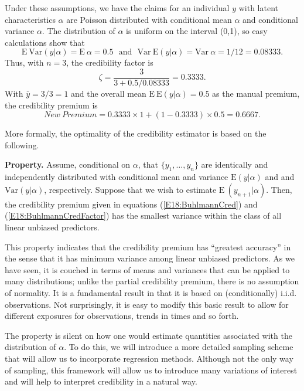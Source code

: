 Under these assumptions, we have the claims for an individual $y$
with latent characteristics $\alpha$ are Poisson distributed with
conditional mean $\alpha$ and conditional variance $\alpha$. The
distribution of $\alpha$ is uniform on the interval (0,1), so easy
calculations show that
\begin{equation*}
\mathrm{E}~\mathrm{Var}(y|\alpha) = \mathrm{E}~\alpha =
0.5~~~\mathrm{and}~~~ \mathrm{Var}~\mathrm{E}(y|\alpha) =
\mathrm{Var}~\alpha = 1/12 = 0.08333.
\end{equation*}
Thus, with $n=3$, the credibility factor is
\begin{equation*}
\zeta = \frac{3}{3+ 0.5/0.08333} = 0.3333.
\end{equation*}
With $\bar{y}=3/3 =1$ and the overall mean
$\mathrm{E}~\mathrm{E}(y|\alpha)=0.5$ as the manual premium, the
credibility premium is
\begin{equation*}
New~Premium =  0.3333 \times 1 + (1 - 0.3333)  \times 0.5 = 0.6667.
\end{equation*}

\linejed

More formally, the optimality of the credibility estimator is based
on the following.

\textbf{Property.} Assume, conditional on $\alpha$, that $\{y_1,
\ldots, y_n \}$ are identically and independently distributed with
conditional mean and variance $\mathrm{E}(y | \alpha)$ and and
$\mathrm{Var}(y | \alpha)$, respectively. Suppose that we wish to
estimate $\mathrm{E}~(y_{n+1}|\alpha)$. Then, the credibility
premium given in equations (\ref{E18:BuhlmannCred}) and
(\ref{E18:BuhlmannCredFactor}) has the smallest variance within the
class of all linear unbiased predictors.

\bigskip

This property indicates that the credibility premium has ``greatest
accuracy'' in the sense that it has minimum variance among linear
unbiased predictors. As we have seen, it is couched in terms of
means and variances that can be applied to many distributions;
unlike the partial credibility premium, there is no assumption of
normality. It is a fundamental result in that it is based on
(conditionally) i.i.d. observations. Not surprisingly, it is easy to
modify this basic result to allow for different exposures for
observations, trends in times and so forth.

The property is silent on how one would estimate quantities
associated with the distribution of $\alpha$. To do this, we will
introduce a more detailed sampling scheme that will allow us to
incorporate regression methods. Although not the only way of
sampling, this framework will allow us to introduce many variations
of interest and will help to interpret credibility in a natural way.


